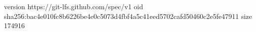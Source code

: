 version https://git-lfs.github.com/spec/v1
oid sha256:bac4e010fc8b6226be4e0c5073d4fbf4a5c41eed5702cafd50460c2e5fe47911
size 174916
